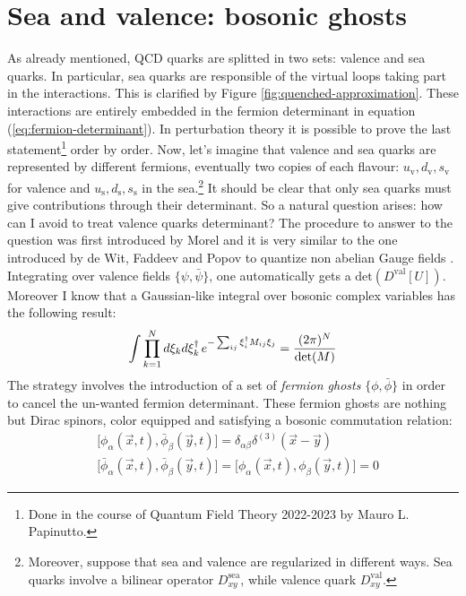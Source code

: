 \documentclass[english, LaM, oneside, noexaminfo]{sapthesis}
\begin{document}
\section{Sea and valence: bosonic ghosts}\label{sec:ghosts}
\noindent
As already mentioned, QCD quarks are splitted in two sets: valence and sea quarks.
In particular, sea quarks are responsible of the virtual loops taking part in the interactions.
This is clarified by Figure \ref{fig:quenched-approximation}.
These interactions are entirely embedded in the fermion determinant in equation (\ref{eq:fermion-determinant}).
In perturbation theory it is possible to prove the last statement\footnote{Done in the course of Quantum Field Theory 2022-2023 by Mauro L. Papinutto.} order by order.
Now, let's imagine that valence and sea quarks are represented by different fermions, eventually two copies of each flavour: $u_\text{v}, d_\text{v}, s_\text{v}$ for valence and $u_\text{s}, d_\text{s}, s_\text{s}$ in the sea.\footnote{Moreover, suppose that sea and valence are regularized in different ways. Sea quarks involve a bilinear operator $D^\text{sea}_{xy}$, while valence quark $D^\text{val}_{xy}$.}
It should be clear that only sea quarks must give contributions through their determinant.
So a natural question arises: how can I avoid to treat valence quarks determinant?
\newline
The procedure to answer to the question was first introduced by Morel \cite{Morel} and it is very similar to the one introduced by de Wit, Faddeev and Popov to quantize non abelian Gauge fields \cite{WeinbergII}.
Integrating over valence fields $\{\psi,\bar\psi\}$, one automatically gets a $\text{det}(D^\text{val}[U])$. 
Moreover I know that a Gaussian-like integral over bosonic complex variables has the following result:
\begin{equation*}
    \int \prod_{k = 1}^{N} d \xi_k  d\xi_k^\dag \hspace*{.5mm} e^{-\sum_{ij} \xi_i^\dag M_{ij} \xi_j} = \frac{(2\pi)^N}{\text{det}(M)}
\end{equation*}
The strategy involves the introduction of a set of {\it fermion ghosts} $\{\phi, \bar\phi \}$ in order to cancel the un-wanted fermion determinant.
These fermion ghosts are nothing but Dirac spinors, color equipped and satisfying a bosonic commutation relation:
\begin{equation*}
    \begin{aligned}
        & \big[\phi_\alpha (\vec x,t), \bar\phi_\beta (\vec y,t)\big] = \delta_{\alpha\beta}\delta^{(3)}(\vec x-\vec y) \\
        & \big[\bar\phi_\alpha (\vec x,t), \bar\phi_\beta (\vec y,t)\big] = \big[\phi_\alpha (\vec x,t), \phi_\beta (\vec y,t)\big] = 0
    \end{aligned}    
\end{equation*}
\end{document}
